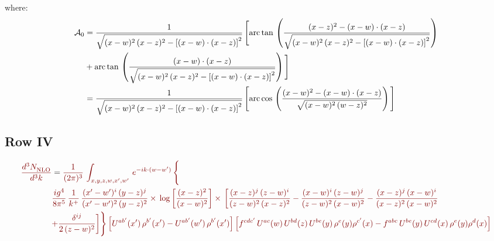 \documentclass[9pt]{article}
\numberwithin{equation}{section}
\begin{document}
where: \begin{align}
\mathcal{A}_{0} & = \frac{1}{\sqrt{(x-w)^{2}\,(x-z)^{2}-\left[(x-w)\cdot (x-z)\right]^{2}}}\, \Bigg[\mathrm{arc\,tan}\,\left(\frac{(x-z)^{2}-(x-w)\cdot (x-z)}{\sqrt{(x-w)^{2}\,(x-z)^{2}-\left[(x-w)\cdot (x-z)\right]^{2}}}\right)\notag \\ & + \mathrm{arc\,tan}\,\left(\frac{(x-w)\cdot (x-z)}{\sqrt{(x-w)^{2}\,(x-z)^{2}-\left[(x-w)\cdot (x-z)\right]^{2}}}\right) \Bigg]\notag \\ & = \frac{1}{\sqrt{(x-w)^{2}\,(x-z)^{2}-\left[(x-w)\cdot (x-z)\right]^{2}}}\, \Bigg[\mathrm{arc\,cos}\,\left(\frac{(x-w)^{2}-(x-w)\cdot (x-z)}{\sqrt{(x-w)^{2}\,(w-z)^{2}}}\right)\Bigg]
\end{align}
\subsection{Row IV}
\begin{align}
    {\color{red!50!black}\frac{d^{3}N_{\rm NLO}^{\rm}}{d^{3}k}}  & = {\color{red!50!black}\frac{1}{(2\pi)^{3}}\,
    \int_{x,y,z,w,x',w'}\,e^{-ik\cdot (w-w^\prime)}\,\Bigg\{}\notag \\
& {\color{red!50!black}\frac{ig^{4}}{8\pi^{5}}\,\frac{1}{k^{+}}\,\frac{(x'-w')^{i}\,(y-z)^{j}}{(x'-w')^{2}\,(y-z)^{2}}\times\,\log{\left[\frac{(x-z)^{2}}{(x-w)^{2}}\right]}\times\, \bigg[\frac{(x-z)^{j}\,(z-w)^{i}}{(z-w)^{2}\,(x-z)^{2}} -\frac{(x-w)^{i}\,(z-w)^{j}}{(z-w)^{2}\,(x-w)^{2}}-\frac{(x-z)^{j}\,(x-w)^{i}}{(x-z)^{2}\,(x-w)^{2}}}\notag \\ & {\color{red!50!black}+\frac{\delta^{ij}}{2\,(z-w)^{2}}\bigg]\Bigg\} \left[U^{ab'}(x')\,\rho^{b'}(x')-U^{ab'}(w')\,\rho^{b'}(x')\right] \left[f^{cdc'}\,U^{ac}(w)\,U^{bd}(z)\,U^{be}(y)\,\rho^{e}(y)\rho^{c'}(x)-f^{abc}\,U^{be}(y)\,U^{cd}(x)\,\rho^{e}(y)\rho^{d}(x)\right]}
\end{align}
\par\noindent
{\color{red}}\par
\end{document}
